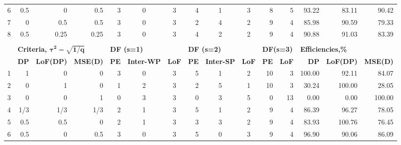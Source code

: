 \begin{table}[h]
{\begin{tabular}{rrrrccccccrrrrr}
6 & 0.5  & 0    & 0.5  & \multicolumn{1}{|r}{3} & 0 & 3 & \multicolumn{1}{|r}{4} & 1 & 3 & \multicolumn{1}{|r}{8}  & 5  & \multicolumn{1}{|r}{93.22}  & 83.11  & 90.42  \\
7 & 0    & 0.5  & 0.5  & \multicolumn{1}{|r}{3} & 0 & 3 & \multicolumn{1}{|r}{2} & 4 & 2 & \multicolumn{1}{|r}{9}  & 4  & \multicolumn{1}{|r}{85.98}  & 90.59  & 79.33  \\
8 & 0.5  & 0.25 & 0.25 & \multicolumn{1}{|r}{3} & 0 & 3 & \multicolumn{1}{|r}{4} & 2 & 2 & \multicolumn{1}{|r}{9}  & 4  & \multicolumn{1}{|r}{90.88}  & 91.03  & 83.39  \\
  &      &      &      &   &   &   &   &   &   &    &    &        &        &        \\  
  & \multicolumn{3}{l}{\textbf{Criteria, $\bm{\tau^2=\sqrt{1/q}}$}}    & \multicolumn{3}{l}{\textbf{DF (s=1)}}   & \multicolumn{3}{l}{\textbf{DF (s=2)}}    & \multicolumn{2}{l}{\textbf{DF(s=3)}} & \multicolumn{3}{l}{\textbf{Efficiencies,\%}}     \\
  & \textbf{DP} & \textbf{LoF(DP)} & \textbf{MSE(D)} & \textbf{PE} & \textbf{Inter-WP} & \textbf{LoF} & \textbf{PE} & \textbf{Inter-SP} & \textbf{LoF}& \textbf{PE}      & \textbf{LoF}      & \textbf{DP} & \textbf{LoF(DP)} & \textbf{MSE(D)} \\
1 & 1    & 0    & 0    & \multicolumn{1}{|r}{3} & 0 & 3 & \multicolumn{1}{|r}{5} & 1 & 2 & \multicolumn{1}{|r}{10} & 3  & \multicolumn{1}{|r}{100.00} & 92.11  & 84.07  \\
2 & 0    & 1    & 0    & \multicolumn{1}{|r}{1} & 2 & 3 & \multicolumn{1}{|r}{2} & 5 & 1 & \multicolumn{1}{|r}{10} & 3  & \multicolumn{1}{|r}{30.24}  & 100.00 & 28.05  \\
3 & 0    & 0    & 1    & \multicolumn{1}{|r}{0} & 3 & 3 & \multicolumn{1}{|r}{0} & 3 & 5 & \multicolumn{1}{|r}{0}  & 13 & \multicolumn{1}{|r}{0.00}   & 0.00   & 100.00 \\
4 &1/3  & 1/3  & 1/3   & \multicolumn{1}{|r}{2} & 1 & 3 & \multicolumn{1}{|r}{5} & 1 & 2 & \multicolumn{1}{|r}{9}  & 4  & \multicolumn{1}{|r}{86.39}  & 96.27  & 78.05  \\
5 & 0.5  & 0.5  & 0    & \multicolumn{1}{|r}{2} & 1 & 3 & \multicolumn{1}{|r}{3} & 3 & 2 & \multicolumn{1}{|r}{9}  & 4  & \multicolumn{1}{|r}{83.93}  & 100.76 & 76.45  \\
6 & 0.5  & 0    & 0.5  & \multicolumn{1}{|r}{3} & 0 & 3 & \multicolumn{1}{|r}{5} & 0 & 3 & \multicolumn{1}{|r}{9}  & 4  & \multicolumn{1}{|r}{96.90}  & 90.06  & 86.09  \\

\end{tabular}}
\end{table}
